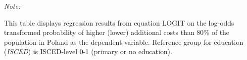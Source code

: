\begin{table}[htbp!]
\begin{adjustbox}{width = 1\textwidth, max height = 0.95\textheight, center}
\begin{threeparttable}[b]
         \begin{tablenotes}\item \medskip \textit{Note:}
            \item This table displays regression results from equation LOGIT on the log-odds transformed probability of higher (lower) additional costs than 80\% of the population in Poland as the dependent variable. Reference group for education (\textit{ISCED}) is ISCED-level 0-1 (primary or no education).
         \end{tablenotes}
      \end{threeparttable}
   \end{adjustbox}
\end{table}


